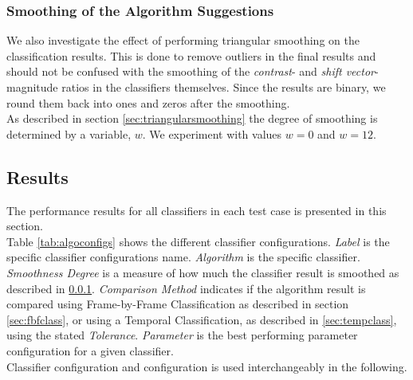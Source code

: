 \subsubsection{Smoothing of the Algorithm Suggestions}\label{sec:classsmooth}
%
We also investigate the effect of performing triangular smoothing on the classification results. This is done to remove outliers in the final results and should not be confused with the smoothing of the \textit{contrast}- and \textit{shift vector}- magnitude ratios in the classifiers themselves. Since the results are binary, we round them back into ones and zeros after the smoothing.\\
As described in section \ref{sec:triangularsmoothing} the degree of smoothing is determined by a variable, $w$. We experiment with values $w=0$ and $w=12$.
%
\subsection{Results}
%
The performance results for all classifiers in each test case is presented in this section.\\
Table \ref{tab:algoconfigs} shows the different classifier configurations. \textit{Label} is the specific classifier configurations name. \textit{Algorithm} is the specific classifier. \textit{Smoothness Degree} is a measure of how much the classifier result is smoothed as described in \ref{sec:classsmooth}. \textit{Comparison Method} indicates if the algorithm result is compared using Frame-by-Frame Classification as described in section \ref{sec:fbfclass}, or using a Temporal Classification, as described in \ref{sec:tempclass}, using the stated \textit{Tolerance}. \textit{Parameter} is the best performing parameter configuration for a given classifier.\\
Classifier configuration and configuration is used interchangeably in the following.
%
